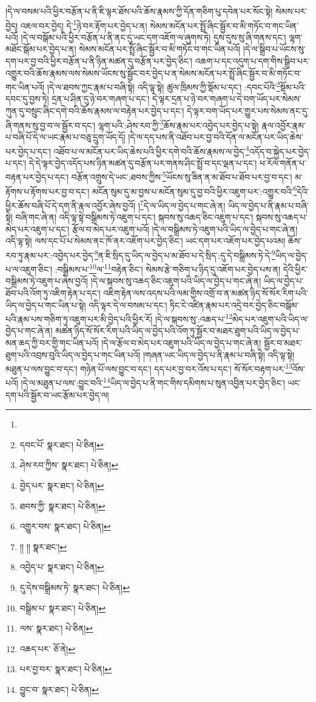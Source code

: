 །དེ་ལ་བསམ་པའི་ཕྱིར་བརྩོན་པ་ནི་ཇི་ལྟར་ཐོས་པའི་ཆོས་རྣམས་ཀྱི་དོན་གཅིག་པུ་དབེན་པར་སོང་སྟེ། སེམས་པར་བྱེད། འཇལ་བར་བྱེད། དེ་\footnote{}ཉེ་བར་རྟོག་པར་བྱེད་པ་ན། སེམས་མངོན་པར་སྤྲོ་ཞིང་སྦྱོར་བ་མི་གཏོང་བ་གང་ཡིན་པའོ། །དེ་ལ་བསྒོམ་པའི་ཕྱིར་བརྩོན་པ་ནི་ནང་དུ་ཡང་དག་འཇོག་ལ་ཞུགས་ཏེ། དུས་དུས་སུ་ཞི་གནས་དང་། ལྷག་མཐོང་སྒོམ་པར་བྱེད་པ་ན། སེམས་མངོན་པར་སྤྲོ་ཞིང་སྦྱོར་བ་མི་གཏོང་བ་གང་ཡིན་པའོ། །དེ་ལ་སྒྲིབ་པ་ཡོངས་སུ་དག་པར་བྱ་བའི་ཕྱིར་བརྩོན་པ་ནི་ཉིན་མཚན་དུ་བརྩོན་པར་བྱེད་ཅིང་། འཆག་པ་དང་འདུག་པ་དག་གིས་སྒྲིབ་པར་འགྱུར་བའི་ཆོས་རྣམས་ལས་སེམས་ཡོངས་སུ་སྦྱོང་བར་བྱེད་པ་ན་སེམས་མངོན་པར་སྤྲོ་ཞིང་སྦྱོར་བ་མི་གཏོང་བ་གང་ཡིན་པའོ། །དེ་ལ་ཐབས་ཀྱང་རྣམ་པ་བཞི་སྟེ། འདི་ལྟ་སྟེ། ཚུལ་ཁྲིམས་ཀྱི་སྡོམ་པ་དང་། :དབང་པོའི་\footnote{དབང་པོ་  སྣར་ཐང་།  པེ་ཅིན། }སྡོམ་པའི་དབང་དུ་བྱས་ཏེ། དྲན་པ་ཤིན་དུ་ཉེ་བར་གཞག་པ་དང་། དེ་ལྟར་དྲན་པ་ཉེ་བར་གཞག་པ་དེ་བག་ཡོད་པར་སེམས་ཀུན་དུ་བསྲུང་ཞིང་དགེ་བའི་ཆོས་རྣམས་ལ་བརྟེན་པར་བྱེད་པ་དང་། དེ་ལྟར་བག་ཡོད་པར་གྱུར་པས་སེམས་ནང་དུ་ཞི་གནས་སུ་བྱ་བ་ལ་སྦྱོར་བ་དང་། ལྷག་པའི་:ཤེས་རབ་ཀྱི་\footnote{ཤེས་རབ་ཀྱིས་  སྣར་ཐང་།  པེ་ཅིན། }ཆོས་རྣམ་པར་འབྱེད་པར་བྱེད་པ་སྟེ། རྣལ་འབྱོར་རྣམ་པ་བཞི་པོ་དེ་ལ་ཡང་རྣམ་པ་བཅུ་དྲུག་ཡོད་དོ། །དེ་ལ་དད་པས་ནི་འཐོབ་པར་བྱ་བའི་དོན་ལ་མངོན་པར་ཡིད་ཆེས་པར་བྱེད་པ་དང་། འཐོབ་པ་ལ་མངོན་པར་ཡིད་ཆེས་པའི་ཕྱིར་དགེ་བའི་ཆོས་རྣམས་ལ་བྱེད་\footnote{བྱེད་པར་  སྣར་ཐང་།  པེ་ཅིན། }འདོད་བ་སྐྱེད་པར་བྱེད་པ་དང་། དེ་དེ་ལྟར་བྱེད་འདོད་པས་ཉིན་མཚན་དུ་བརྩོན་པར་གནས་ཤིང་སྤྲོ་བ་དང་ལྡན་པ་དང་། ཕ་རོལ་གནོན་པ་བརྟན་པར་བྱེད་པ་དང་། བརྩོན་འགྲུས་དེ་ཡང་:ཐབས་ཀྱིས་\footnote{ཐབས་ཀྱི་  སྣར་ཐང་།  པེ་ཅིན། }ཡོངས་སུ་ཟིན་ན་མ་ཐོབ་པ་ཐོབ་པར་བྱ་བ་དང་། མ་རྟོགས་པ་རྟོགས་པར་བྱ་བ་དང་། མངོན་སུམ་དུ་མ་བྱས་པ་མངོན་སུམ་དུ་བྱ་བའི་ཕྱིར་འཇུག་པར་:འགྱུར་བའི་\footnote{འགྱུར་བས་  སྣར་ཐང་།  པེ་ཅིན། }དེའི་ཕྱིར་ཆོས་བཞི་པོ་དེ་དག་ནི་རྣལ་འབྱོར་ཞེས་བྱའོ། །\footnote{།། །།  སྣར་ཐང་། }དེ་ལ་ཡིད་ལ་བྱེད་པ་གང་ཞེ་ན། ཡིད་ལ་བྱེད་པ་ནི་རྣམ་པ་བཞི་སྟེ། བཞི་གང་ཞེ་ན། འདི་ལྟ་སྟེ་བསྒྲིམས་ཏེ་འཇུག་པ་དང་། སྐབས་སུ་འཆད་ཅིང་འཇུག་པ་དང་། སྐབས་སུ་འཆད་པ་མེད་པར་འཇུག་པ་དང་། རྩོལ་བ་མེད་པར་འཇུག་པའོ། །དེ་ལ་བསྒྲིམས་ཏེ་འཇུག་པའི་ཡིད་ལ་བྱེད་པ་གང་ཞེ་ན། འདི་ལྟ་སྟེ། ལས་དང་པོ་པ་སེམས་ནང་ཁོ་ནར་འཇོག་པར་བྱེད་ཅིང་། ཡང་དག་པར་འཇོག་པར་བྱེད་པའམ། ཆོས་རབ་ཏུ་རྣམ་པར་:འབྱེད་པར་བྱེད་\footnote{འབྱེད་པ་  སྣར་ཐང་།  པེ་ཅིན། }ན་ཇི་སྲིད་དུ་ཡིད་ལ་བྱེད་པ་མ་ཐོབ་པ་དེ་སྲིད་:དུ་དེ་བསྒྲིམས་ཏེ་དེ་\footnote{དུ་དེས་བསྒྲིམས་ཏེ་  སྣར་ཐང་།  པེ་ཅིན། }ཡིད་ལ་བྱེད་པ་ལ་འཇུག་ཅིང་། :བསྒྲིམས་པ་\footnote{བསྒྲིམ་པ་  སྣར་ཐང་།  པེ་ཅིན། }ལ་\footnote{ལས་  སྣར་ཐང་།  པེ་ཅིན། }བརྟེན་ཅིང་། སེམས་རྩེ་གཅིག་པ་ཉིད་དུ་འཇོག་པར་བྱེད་པས་ན། དེའི་ཕྱིར་བསྒྲིམས་ཏེ་འཇུག་པ་ཞེས་བྱའོ། །དེ་ལ་སྐབས་སུ་འཆད་ཅིང་འཇུག་པའི་ཡིད་ལ་བྱེད་པ་གང་ཞེ་ན། ཡིད་ལ་བྱེད་པ་ཐོབ་པའི་འོག་ཏུ་འཇིག་རྟེན་པ་དང་། འཇིག་རྟེན་ལས་འདས་པའི་ལམ་གྱིས་འགྲོ་བ་ན་མཚན་ཉིད་སོ་སོར་རིག་པའི་ཡིད་ལ་བྱེད་པ་གང་ཡིན་པ་སྟེ། འདི་ལྟར་དེ་ལ་བསམ་པ་དང་། ཏིང་ངེ་འཛིན་རྣམ་པར་འདྲེ་བར་བྱེད་ཅིང་བསྒོམ་པའི་རྣམ་པས་གཅིག་ཏུ་འཇུག་པར་མི་བྱེད་པའི་ཕྱིར་རོ། །དེ་ལ་སྐབས་སུ་:འཆད་པ་\footnote{འཆད་པར་  ཅོ་ནེ། }མེད་པར་འཇུག་པའི་ཡིད་ལ་བྱེད་པ་གང་ཞེ་ན། མཚན་ཉིད་སོ་སོར་རིག་པའི་ཡིད་ལ་བྱེད་པའི་འོག་ཏུ་སྦྱོར་བ་མཐར་ཐུག་པའི་ཡིད་ལ་བྱེད་པ་མན་ཆད་ཀྱི་བར་གྱི་གང་ཡིན་པའོ། །དེ་ལ་རྩོལ་བ་མེད་པར་འཇུག་པའི་ཡིད་ལ་བྱེད་པ་གང་ཞེ་ན། སྦྱོར་བ་མཐར་ཐུག་པའི་འབྲས་བུའི་ཡིད་ལ་བྱེད་པ་གང་ཡིན་པའོ། །གཞན་ཡང་ཡིད་ལ་བྱེད་པ་ནི་རྣམ་པ་བཞི་སྟེ། འདི་ལྟ་སྟེ། མཐུན་པ་ལས་བྱུང་བ་དང་། གཉེན་པོ་ལས་བྱུང་བ་དང་། དད་པར་བྱ་བར་འོས་པ་དང་། སོ་སོར་བརྟག་པར་\footnote{པར་བྱ་བར་  སྣར་ཐང་།  པེ་ཅིན། }འོས་པའོ། །དེ་ལ་མཐུན་པ་ལས་:བྱུང་བའི་\footnote{བྱུང་བ་  སྣར་ཐང་།  པེ་ཅིན། }ཡིད་ལ་བྱེད་པ་ནི་གང་གིས་དམིགས་པ་སུན་འབྱིན་པར་བྱེད་ཅིང་། ཡང་དག་པའི་སྦྱོར་བ་ཡང་རྩོམ་པར་བྱེད་ལ། 